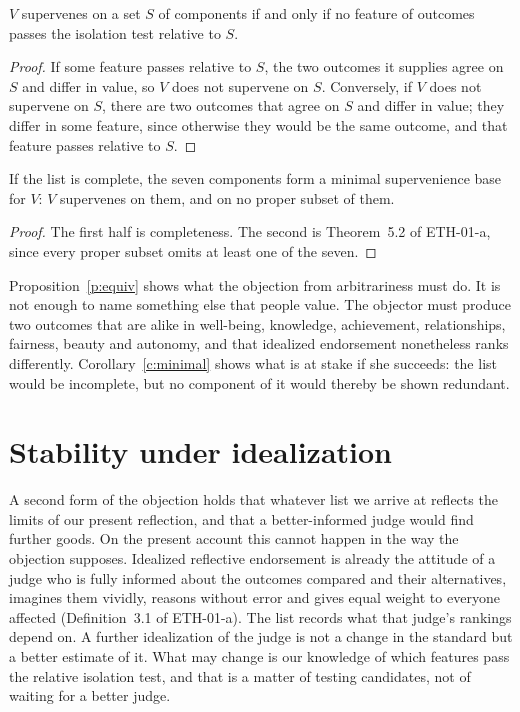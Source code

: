 \documentclass{situationist-preprint}
\begin{document}
\begin{proposition}\label{p:equiv}
$V$ supervenes on a set $S$ of components if and only if no feature of outcomes passes the isolation test relative to $S$.
\end{proposition}

\begin{proof}
If some feature passes relative to $S$, the two outcomes it supplies agree on $S$ and differ in value, so $V$ does not supervene on $S$. Conversely, if $V$ does not supervene on $S$, there are two outcomes that agree on $S$ and differ in value; they differ in some feature, since otherwise they would be the same outcome, and that feature passes relative to $S$.
\end{proof}

\begin{corollary}\label{c:minimal}
If the list is complete, the seven components form a minimal supervenience base for $V$: $V$ supervenes on them, and on no proper subset of them.
\end{corollary}

\begin{proof}
The first half is completeness. The second is Theorem~5.2 of ETH-01-a, since every proper subset omits at least one of the seven.
\end{proof}

Proposition~\ref{p:equiv} shows what the objection from arbitrariness must do. It is not enough to name something else that people value. The objector must produce two outcomes that are alike in well-being, knowledge, achievement, relationships, fairness, beauty and autonomy, and that idealized endorsement nonetheless ranks differently. Corollary~\ref{c:minimal} shows what is at stake if she succeeds: the list would be incomplete, but no component of it would thereby be shown redundant.

\section{Stability under idealization}

A second form of the objection holds that whatever list we arrive at reflects the limits of our present reflection, and that a better-informed judge would find further goods. On the present account this cannot happen in the way the objection supposes. Idealized reflective endorsement is already the attitude of a judge who is fully informed about the outcomes compared and their alternatives, imagines them vividly, reasons without error and gives equal weight to everyone affected (Definition~3.1 of ETH-01-a). The list records what that judge's rankings depend on. A further idealization of the judge is not a change in the standard but a better estimate of it. What may change is our knowledge of which features pass the relative isolation test, and that is a matter of testing candidates, not of waiting for a better judge.
\end{document}
